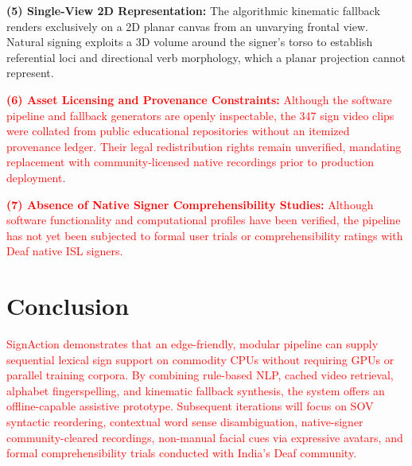 \documentclass[conference,a4paper,10pt]{IEEEtran}
\begin{document}
\textbf{(5) Single-View 2D Representation:} The algorithmic kinematic fallback renders exclusively on a 2D planar canvas from an unvarying frontal view. Natural signing exploits a 3D volume around the signer's torso to establish referential loci and directional verb morphology, which a planar projection cannot represent.

\textcolor{red}{\textbf{(6) Asset Licensing and Provenance Constraints:} Although the software pipeline and fallback generators are openly inspectable, the 347 sign video clips were collated from public educational repositories without an itemized provenance ledger. Their legal redistribution rights remain unverified, mandating replacement with community-licensed native recordings prior to production deployment.}

\textcolor{red}{\textbf{(7) Absence of Native Signer Comprehensibility Studies:} Although software functionality and computational profiles have been verified, the pipeline has not yet been subjected to formal user trials or comprehensibility ratings with Deaf native ISL signers.}

\section{Conclusion}
\label{sec:conclude}

\textcolor{red}{SignAction demonstrates that an edge-friendly, modular pipeline can supply sequential lexical sign support on commodity CPUs without requiring GPUs or parallel training corpora. By combining rule-based NLP, cached video retrieval, alphabet fingerspelling, and kinematic fallback synthesis, the system offers an offline-capable assistive prototype. Subsequent iterations will focus on SOV syntactic reordering, contextual word sense disambiguation, native-signer community-cleared recordings, non-manual facial cues via expressive avatars, and formal comprehensibility trials conducted with India's Deaf community.}


\end{document}
